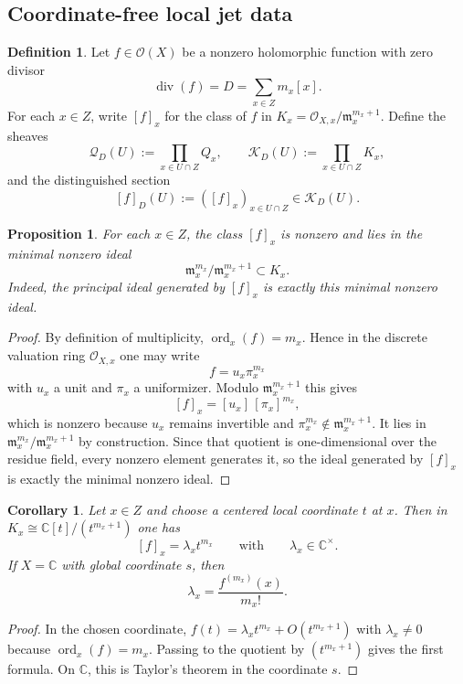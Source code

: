 \documentclass[11pt,a4paper]{article}
\numberwithin{equation}{section}
\newtheorem{proposition}[theorem]{Proposition}
\newtheorem{corollary}[theorem]{Corollary}
\theoremstyle{definition}
\newtheorem{definition}[theorem]{Definition}
\theoremstyle{remark}
\DeclareMathOperator{\ord}{ord}
\newcommand{\CC}{\mathbb C}
\newcommand{\cO}{\mathcal O}
\newcommand{\cQ}{\mathcal Q}
\newcommand{\cK}{\mathcal K}
\begin{document}
\subsection{Coordinate-free local jet data}

\begin{definition}
Let $f\in\cO(X)$ be a nonzero holomorphic function with zero divisor
\[
\operatorname{div}(f)=D=\sum_{x\in Z}m_x[x].
\]
For each $x\in Z$, write $[f]_x$ for the class of $f$ in $K_x=\cO_{X,x}/\mathfrak m_x^{m_x+1}$.  Define the sheaves
\[
\cQ_D(U):=\prod_{x\in U\cap Z}Q_x,
\qquad
\cK_D(U):=\prod_{x\in U\cap Z}K_x,
\]
and the distinguished section
\[
[f]_D(U):=([f]_x)_{x\in U\cap Z}\in\cK_D(U).
\]
\end{definition}

\begin{proposition}\label{P1:prop:derivative-enhanced-local}
For each $x\in Z$, the class $[f]_x$ is nonzero and lies in the minimal nonzero ideal
\[
\mathfrak m_x^{m_x}/\mathfrak m_x^{m_x+1}\subset K_x.
\]
Indeed, the principal ideal generated by $[f]_x$ is exactly this minimal nonzero ideal.
\end{proposition}

\begin{proof}
By definition of multiplicity, $\ord_x(f)=m_x$.  Hence in the discrete valuation ring $\cO_{X,x}$ one may write
\[
f=u_x\pi_x^{m_x}
\]
with $u_x$ a unit and $\pi_x$ a uniformizer.  Modulo $\mathfrak m_x^{m_x+1}$ this gives
\[
[f]_x=[u_x]\,[\pi_x]^{m_x},
\]
which is nonzero because $u_x$ remains invertible and $\pi_x^{m_x}\notin\mathfrak m_x^{m_x+1}$.  It lies in $\mathfrak m_x^{m_x}/\mathfrak m_x^{m_x+1}$ by construction.  Since that quotient is one-dimensional over the residue field, every nonzero element generates it, so the ideal generated by $[f]_x$ is exactly the minimal nonzero ideal.
\end{proof}

\begin{corollary}\label{P1:cor:coordinate-derivative}
Let $x\in Z$ and choose a centered local coordinate $t$ at $x$.  Then in $K_x\cong\CC[t]/(t^{m_x+1})$ one has
\[
[f]_x=\lambda_x t^{m_x}
\qquad\text{with}\qquad
\lambda_x\in\CC^\times.
\]
If $X=\CC$ with global coordinate $s$, then
\[
\lambda_x=\frac{f^{(m_x)}(x)}{m_x!}.
\]
\end{corollary}

\begin{proof}
In the chosen coordinate, $f(t)=\lambda_x t^{m_x}+O(t^{m_x+1})$ with $\lambda_x\neq0$ because $\ord_x(f)=m_x$.  Passing to the quotient by $(t^{m_x+1})$ gives the first formula.  On $\CC$, this is Taylor's theorem in the coordinate $s$.
\end{proof}
\end{document}
